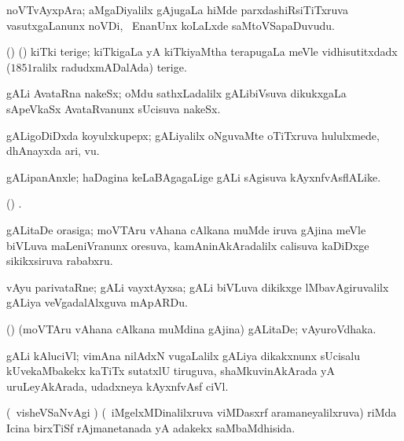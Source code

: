 {{{{{{\bentry
{}
  \gl{\nA}\bmng
noVTvAyxpAra; aMgaDiyalilx gAjugaLa hiMde parxdashiRsiTiTxruva vasutxgaLanunx noVDi, \sA\ EnanUnx koLaLxde saMtoVSapaDuvudu. 
\emng
\eentry

\bentry
{}
\gl{\nA}
\bmng
(\birx) (\ca) kiTki terige; kiTkigaLa yA kiTkiyaMtha terapugaLa meVle vidhisutitxdadx ($1851$ralilx radudxmADalAda) terige. 
\emng
\eentry

\bentry
{}
  \gl{\nA}\bmng
{} 
\emng
\eentry

\bentry
{}
  \gl{\nA}\bmng
gALi AvataRna nakeSx; oMdu sathxLadalilx gALibiVsuva dikukxgaLa sApeVkaSx AvataRvanunx sUcisuva nakeSx. 
\emng
\eentry

\bentry
{}
  \gl{\nA}\bmng
gALigoDiDxda koyulxkupepx; gALiyalilx oNguvaMte oTiTxruva hululxmede, dhAnayxda ari, \mo vu. 
\emng
\eentry

\bentry
{}
  \gl{\nA}\bmng
gALipanAnxle; haDagina keLaBAgagaLige gALi sAgisuva kAyxnfvAsflALike. 
\emng
\eentry

\bentry
{}
  \gl{\nA}\bmng
(\birx) . 
\emng

\noindent
\gl{\pagu}
\bmng
{} gALitaDe orasiga; moVTAru vAhana cAlkana muMde iruva gAjina meVle biVLuva maLeniVranunx oresuva, kamAninAkAradalilx calisuva kaDiDxge sikikxsiruva rababxru. 
\emng
\eentry

\bentry
{}
 \gl{\nA}\bmng
vAyu parivataRne; gALi vayxtAyxsa; gALi biVLuva dikikxge lMbavAgiruvalilx gALiya veVgadalAlxguva mApARDu. 
\emng
\eentry

\bentry
{}
  \gl{\nA}\bmng
(\ame) (moVTAru vAhana cAlkana muMdina gAjina) gALitaDe; vAyuroVdhaka. 
\emng
\eentry

\bentry
{}
  \gl{\nA}\bmng
{} 
\emng
\eentry

\bentry
{}
  \gl{\nA}\bmng
gALi kAluciVl; vimAna nilAdxN \mo vugaLalilx gALiya dikakxnunx sUcisalu kUvekaMbakekx kaTiTx sutatxlU tiruguva, shaMkuvinAkArada yA uruLeyAkArada, udadxneya kAyxnfvAsf ciVl. 
\emng
\eentry

\bentry
{}
  \gl{\nA} \bmng
(\sA\ visheVSaNvAgi \parx) (\da\ iMgelxMDinalilxruva viMDasxrf aramaneyalilxruva) riMda Icina birxTiSf rAjmanetanada yA adakekx saMbaMdhisida. 
\emng

}}}}}}
